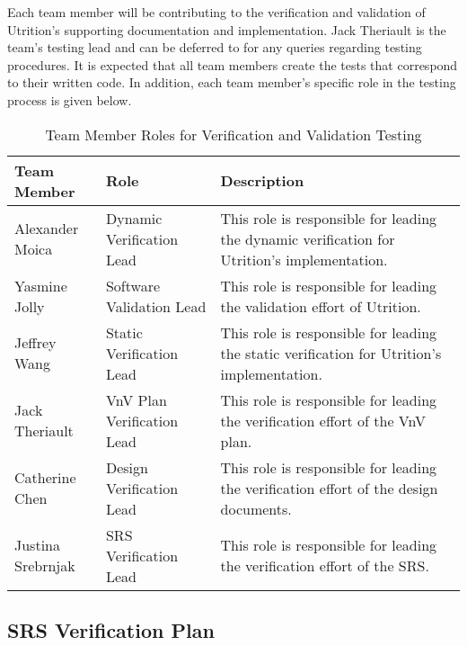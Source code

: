 \documentclass[12pt, titlepage]{article}
\begin{document}
	Each team member will be contributing to the verification and validation of Utrition's supporting documentation and implementation. Jack Theriault is the team's testing lead and can be deferred to for any queries regarding testing procedures. It is expected that all team members create the tests that correspond to their written code. In addition, each team member's specific role in the testing process is given below.
	
	\begin{table}[H]
		\centering
		\label{Table:Testing_Roles}
		\begin{tabular}{|p{3.2cm}|p{4cm}|p{5.5cm}|}
			\hline
			\textbf{Team Member} & \textbf{Role} & \textbf{Description}\\ \hline
			Alexander Moica& Dynamic Verification Lead& This role is responsible for leading the dynamic verification for Utrition's implementation.\\ \hline
			Yasmine Jolly& Software Validation Lead & This role is responsible for leading the validation effort of Utrition.\\ \hline
			Jeffrey Wang& Static Verification Lead & This role is responsible for leading the static verification for Utrition's implementation.\\ \hline
			Jack Theriault& VnV Plan Verification Lead& This role is responsible for leading the verification effort of the VnV plan.\\ \hline
			Catherine Chen& Design Verification Lead& This role is responsible for leading the verification effort of the design documents.\\ \hline
			Justina Srebrnjak& SRS Verification Lead& This role is responsible for leading the verification effort of the SRS. \\ \hline
		\end{tabular}
		\caption{Team Member Roles for Verification and Validation Testing}
	\end{table} 
	
	\subsection{SRS Verification Plan}
	
	
	
\end{document}
